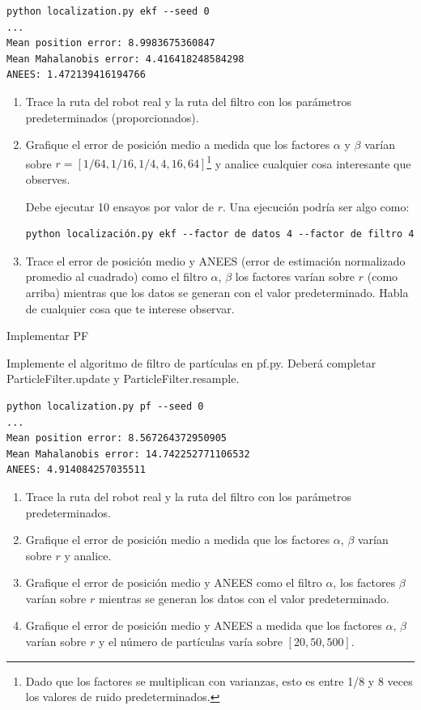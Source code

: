 \documentclass[tp]{lcc}
\begin{document}
\begin{lstlisting}[style=bash] 
python localization.py ekf --seed 0
...
Mean position error: 8.9983675360847
Mean Mahalanobis error: 4.416418248584298
ANEES: 1.472139416194766
\end{lstlisting}


	\begin{enumerate}
		\item Trace la ruta del robot real y la ruta del filtro con los parámetros predeterminados (proporcionados).
		\item  Grafique el error de posición medio a medida que los factores $\alpha$ y $\beta$ varían sobre $r = [1/64, 1/16, 1/4, 4, 16, 64]$\footnote{Dado que los factores se multiplican con varianzas, esto es entre 1/8 y 8 veces los valores de ruido predeterminados.} y analice cualquier cosa interesante que observes.
		
		Debe ejecutar 10 ensayos por valor de $r$. Una ejecución podría ser algo como:

\begin{lstlisting}[style=bash] 
python localización.py ekf --factor de datos 4 --factor de filtro 4
\end{lstlisting}

		\item Trace el error de posición medio y ANEES (error de estimación normalizado promedio al cuadrado) como el filtro $\alpha$, $\beta$ los factores varían sobre $r$ (como arriba) mientras que los datos se generan con el valor predeterminado. Habla de cualquier cosa que te interese observar.
	\end{enumerate}


	\ejercicio Implementar PF
	
	Implemente el algoritmo de filtro de partículas en pf.py. Deberá completar ParticleFilter.update y ParticleFilter.resample.

\begin{lstlisting}[style=bash] 
python localization.py pf --seed 0
...
Mean position error: 8.567264372950905
Mean Mahalanobis error: 14.742252771106532
ANEES: 4.914084257035511
\end{lstlisting}

	\begin{enumerate}
		\item Trace la ruta del robot real y la ruta del filtro con los parámetros predeterminados.
		\item Grafique el error de posición medio a medida que los factores $\alpha$, $\beta$ varían sobre $r$ y analice.
		\item Grafique el error de posición medio y ANEES como el filtro $\alpha$, los factores $\beta$ varían sobre $r$ mientras se generan los datos
		con el valor predeterminado.
		\item Grafique el error de posición medio y ANEES a medida que los factores $\alpha$, $\beta$ varían sobre $r$ y el número de partículas varía
		sobre $[20, 50, 500]$.
	\end{enumerate}


	\printbibliography
	
\end{document}
